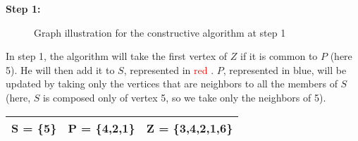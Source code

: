     \begin{minipage}{\linewidth}
        \textbf{Step 1:} \newline
        \begin{minipage}{0.4\textwidth}
            \begin{figure}[H]
                \centering
                \caption{Graph illustration for the constructive algorithm at step 1}
                \label{fig:constructive-mewc-maxedge-step1}
            \end{figure}
        \end{minipage}
        \begin{minipage}{0.6\textwidth}
            In step 1, the algorithm will take the first vertex of $Z$ if it is common to $P$ (here 5). He will then add it to $S$, represented in \textcolor{red}{red} . $P$, represented in \textcolor{Cerulean}{blue}, will be updated by taking only the vertices that are neighbors to all the members of $S$ (here, $S$ is composed only of vertex 5, so we take only the neighbors of 5).
    
            \begin{center}
                \begin{tabular}{|lll|}
                    \hline
                    S = \{5\} & P = \{4,2,1\} & Z = \{3,4,2,1,6\} \\
                    \hline
                \end{tabular}
            \end{center}
        \end{minipage}
    \end{minipage} 

